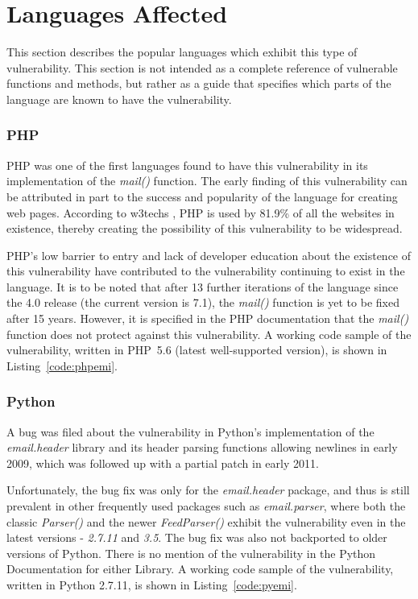 \section{Languages Affected}

This section describes the popular languages which exhibit this type of vulnerability. This section is not intended as a complete reference of vulnerable functions and methods, but rather as a guide that specifies which parts of the language are known to have the vulnerability.

\subsubsection{PHP} 
PHP was one of the first languages found to have this vulnerability in its implementation of the \emph{mail()} function. The early finding of this vulnerability can be attributed in part to the success and popularity of the language for creating web pages. According to w3techs \cite{W3techs}, PHP is used by 81.9\% of all the websites in existence, thereby creating the possibility of this vulnerability to be widespread. 

PHP's low barrier to entry and lack of developer education about the existence of this vulnerability have contributed to the vulnerability continuing to exist in the language.
It is to be noted that after 13 further iterations of the language since the 4.0 release (the current version is 7.1), the \emph{mail()} function is yet to be fixed after 15 years. However, it is specified in the PHP documentation \cite{PHPDocs} that the \emph{mail()} function does not protect against this vulnerability.
A working code sample of the vulnerability, written in PHP~5.6 (latest well-supported version), is shown in  Listing~\ref{code:phpemi}.


\subsubsection{Python} 
A bug was filed about the vulnerability in Python's implementation of the \emph{email.header} library and its header parsing functions allowing newlines in early 2009, which was followed up with a partial patch in early 2011. 

Unfortunately, the bug fix was only for the \emph{email.header} package, and thus is still prevalent in other frequently used packages such as \emph{email.parser}, where both the classic \emph{Parser()} and the newer \emph{FeedParser()} exhibit the vulnerability even in the latest versions - \emph{2.7.11} and \emph{3.5}. The bug fix was also not backported to older versions of Python. 
There is no mention of the vulnerability in the Python Documentation for either Library.
A working code sample of the vulnerability, written in Python 2.7.11, is shown in Listing~\ref{code:pyemi}.



